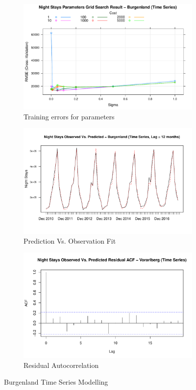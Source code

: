 \documentclass[a4paper,reqno,]{article}
\begin{document}
\begin{figure}[H]
  \centering
  \begin{subfigure}[b]{0.32\linewidth}
    \includegraphics[width=\linewidth]{images/SVR/BurgenlandGrid.pdf}
    \caption{Training errors for parameters}
  \end{subfigure}
  \begin{subfigure}[b]{0.32\linewidth}
    \includegraphics[width=\linewidth]{images/SVR/BurgenlandTimeSeries.pdf}
    \caption{Prediction Vs. Observation Fit}
  \end{subfigure}
  \begin{subfigure}[b]{0.32\linewidth}
    \includegraphics[width=\linewidth]{images/SVR/BurgenlandACF.pdf}
    \caption{Residual Autocorrelation}
  \end{subfigure}
  \caption{Burgenland Time Series Modelling}
  \label{fig:Time Series}
\end{figure}
\end{document}
